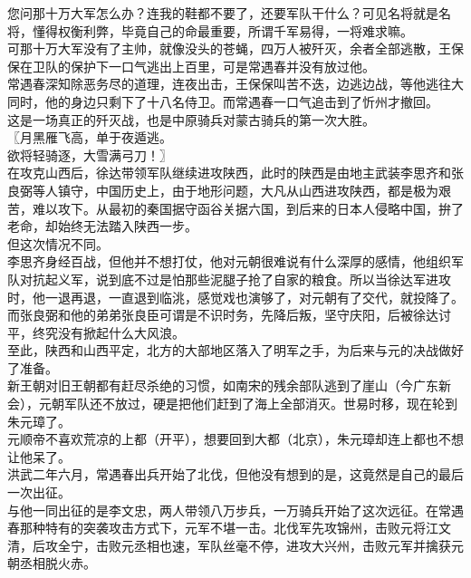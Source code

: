 \begin{multicols}{\theparacolNo}
您问那十万大军怎么办？连我的鞋都不要了，还要军队干什么？可见名将就是名将，懂得权衡利弊，毕竟自己的命最重要，所谓千军易得，一将难求嘛。\\

可那十万大军没有了主帅，就像没头的苍蝇，四万人被歼灭，余者全部逃散，王保保在卫队的保护下一口气逃出上百里，可是常遇春并没有放过他。\\

常遇春深知除恶务尽的道理，连夜出击，王保保叫苦不迭，边逃边战，等他逃往大同时，他的身边只剩下了十八名侍卫。而常遇春一口气追击到了忻州才撤回。\\

这是一场真正的歼灭战，也是中原骑兵对蒙古骑兵的第一次大胜。\\

〖月黑雁飞高，单于夜遁逃。\\

欲将轻骑逐，大雪满弓刀！〗\\

在攻克山西后，徐达带领军队继续进攻陕西，此时的陕西是由地主武装李思齐和张良弼等人镇守，中国历史上，由于地形问题，大凡从山西进攻陕西，都是极为艰苦，难以攻下。从最初的秦国据守函谷关据六国，到后来的日本人侵略中国，拚了老命，却始终无法踏入陕西一步。\\

但这次情况不同。\\

李思齐身经百战，但他并不想打仗，他对元朝很难说有什么深厚的感情，他组织军队对抗起义军，说到底不过是怕那些泥腿子抢了自家的粮食。所以当徐达军进攻时，他一退再退，一直退到临洮，感觉戏也演够了，对元朝有了交代，就投降了。而张良弼和他的弟弟张良臣可谓是不识时务，先降后叛，坚守庆阳，后被徐达讨平，终究没有掀起什么大风浪。\\

至此，陕西和山西平定，北方的大部地区落入了明军之手，为后来与元的决战做好了准备。\\

新王朝对旧王朝都有赶尽杀绝的习惯，如南宋的残余部队逃到了崖山（今广东新会），元朝军队还不放过，硬是把他们赶到了海上全部消灭。世易时移，现在轮到朱元璋了。\\

元顺帝不喜欢荒凉的上都（开平），想要回到大都（北京），朱元璋却连上都也不想让他呆了。\\

洪武二年六月，常遇春出兵开始了北伐，但他没有想到的是，这竟然是自己的最后一次出征。\\

与他一同出征的是李文忠，两人带领八万步兵，一万骑兵开始了这次远征。在常遇春那种特有的突袭攻击方式下，元军不堪一击。北伐军先攻锦州，击败元将江文清，后攻全宁，击败元丞相也速，军队丝毫不停，进攻大兴州，击败元军并擒获元朝丞相脱火赤。\\


\end{multicols}
